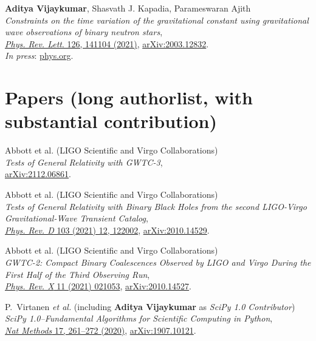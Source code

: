 \begin{etaremune}
	\item 
	\textbf{Aditya Vijaykumar}, Shasvath J. Kapadia, Parameswaran Ajith\\
	\textit{Constraints on the time variation of the gravitational constant using gravitational wave observations of binary neutron stars},\\
	\href{https://journals.aps.org/prl/abstract/10.1103/PhysRevLett.126.141104}{\textit{Phys. Rev. Lett}. 126, 141104 (2021)}, \href{https://arxiv.org/abs/2003.12832}{arXiv:2003.12832}.\\
	\textit{In press}: \href{https://phys.org/news/2021-05-constraints-variation-gravitational-constant.html}{phys.org}.

\end{etaremune}

\section{Papers (long authorlist, with substantial contribution)}
\begin{etaremune}[resume]
	\item Abbott et al. (LIGO Scientific and Virgo Collaborations)\\
	\textit{Tests of General Relativity with GWTC-3},\\
	\href{https://arxiv.org/abs/2112.06861}{arXiv:2112.06861}.
	
	\item Abbott et al. (LIGO Scientific and Virgo Collaborations)\\
	\textit{Tests of General Relativity with Binary Black Holes from the second LIGO-Virgo Gravitational-Wave Transient Catalog},\\
	\href{https://journals.aps.org/prd/abstract/10.1103/PhysRevD.103.122002}{\textit{Phys. Rev. D} 103 (2021) 12, 122002}, \href{https://arxiv.org/abs/2010.14529}{arXiv:2010.14529}.
	
	\item Abbott et al. (LIGO Scientific and Virgo Collaborations)\\
	\textit{GWTC-2: Compact Binary Coalescences Observed by LIGO and Virgo During the First Half of the Third Observing Run},\\
	\href{https://journals.aps.org/prx/abstract/10.1103/PhysRevX.11.021053}{\textit{Phys. Rev. X} 11 (2021) 021053}, \href{https://arxiv.org/abs/2010.14527}{arXiv:2010.14527}.	
	
	\item 	P.~Virtanen {\it et al.} (including \textbf{Aditya Vijaykumar} as \textit{SciPy 1.0 Contributor})\\
	\textit{SciPy 1.0--Fundamental Algorithms for Scientific Computing in Python},\\
	\href{https://www.nature.com/articles/s41592-019-0686-2}{\textit{Nat Methods} 17, 261–272 (2020)},
	\href{https://arxiv.org/abs/1907.10121}{arXiv:1907.10121}.
	
\end{etaremune}